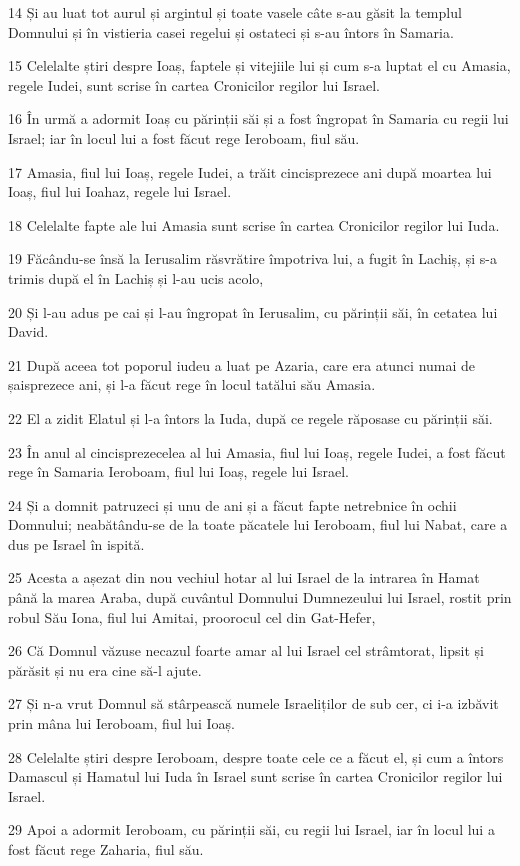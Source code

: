 \par 14 Și au luat tot aurul și argintul și toate vasele câte s-au găsit la templul Domnului și în vistieria casei regelui și ostateci și s-au întors în Samaria.
\par 15 Celelalte știri despre Ioaș, faptele și vitejiile lui și cum s-a luptat el cu Amasia, regele Iudei, sunt scrise în cartea Cronicilor regilor lui Israel.
\par 16 În urmă a adormit Ioaș cu părinții săi și a fost îngropat în Samaria cu regii lui Israel; iar în locul lui a fost făcut rege Ieroboam, fiul său.
\par 17 Amasia, fiul lui Ioaș, regele Iudei, a trăit cincisprezece ani după moartea lui Ioaș, fiul lui Ioahaz, regele lui Israel.
\par 18 Celelalte fapte ale lui Amasia sunt scrise în cartea Cronicilor regilor lui Iuda.
\par 19 Făcându-se însă la Ierusalim răsvrătire împotriva lui, a fugit în Lachiș, și s-a trimis după el în Lachiș și l-au ucis acolo,
\par 20 Și l-au adus pe cai și l-au îngropat în Ierusalim, cu părinții săi, în cetatea lui David.
\par 21 După aceea tot poporul iudeu a luat pe Azaria, care era atunci numai de șaisprezece ani, și l-a făcut rege în locul tatălui său Amasia.
\par 22 El a zidit Elatul și l-a întors la Iuda, după ce regele răposase cu părinții săi.
\par 23 În anul al cincisprezecelea al lui Amasia, fiul lui Ioaș, regele Iudei, a fost făcut rege în Samaria Ieroboam, fiul lui Ioaș, regele lui Israel.
\par 24 Și a domnit patruzeci și unu de ani și a făcut fapte netrebnice în ochii Domnului; neabătându-se de la toate păcatele lui Ieroboam, fiul lui Nabat, care a dus pe Israel în ispită.
\par 25 Acesta a așezat din nou vechiul hotar al lui Israel de la intrarea în Hamat până la marea Araba, după cuvântul Domnului Dumnezeului lui Israel, rostit prin robul Său Iona, fiul lui Amitai, proorocul cel din Gat-Hefer,
\par 26 Că Domnul văzuse necazul foarte amar al lui Israel cel strâmtorat, lipsit și părăsit și nu era cine să-l ajute.
\par 27 Și n-a vrut Domnul să stârpească numele Israeliților de sub cer, ci i-a izbăvit prin mâna lui Ieroboam, fiul lui Ioaș.
\par 28 Celelalte știri despre Ieroboam, despre toate cele ce a făcut el, și cum a întors Damascul și Hamatul lui Iuda în Israel sunt scrise în cartea Cronicilor regilor lui Israel.
\par 29 Apoi a adormit Ieroboam, cu părinții săi, cu regii lui Israel, iar în locul lui a fost făcut rege Zaharia, fiul său.

